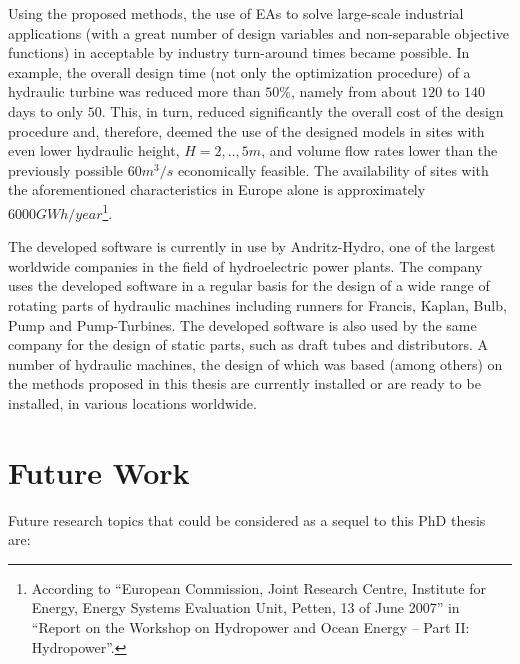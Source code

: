Using the proposed  methods, the use of EAs to solve large-scale industrial applications (with a great number of design variables and non-separable objective functions) in acceptable by industry turn-around times became possible. In example, the overall design time (not only the optimization procedure) of a hydraulic turbine was reduced more than $50\%$, namely from about $120$ to $140$ days to only $50$. This, in turn, reduced significantly the overall cost of the design procedure and, therefore, deemed the use of the designed models in sites with even lower hydraulic height, $H=2,..,5m$, and volume flow rates lower than the previously possible $60m^3/s$ economically feasible. The availability of sites with the aforementioned characteristics in Europe alone is approximately $6000GWh/year$\footnote{According to ``European Commission, Joint Research Centre, Institute for Energy, Energy Systems Evaluation Unit,  Petten, 13 of June 2007'' in  ``Report on the Workshop on Hydropower and Ocean Energy – Part II: Hydropower''.}.

The developed software is currently in use by Andritz-Hydro, one of the largest worldwide companies in the field of hydroelectric power plants. The company uses the developed software in a regular basis for the design of a wide range of rotating parts of hydraulic machines including runners for Francis, Kaplan, Bulb, Pump and Pump-Turbines. The developed software is also used by the same company for the design of static parts, such as draft tubes and distributors. A number of hydraulic machines, the design of which was based (among others) on the methods proposed in this thesis are currently installed or are ready to be installed,  in various locations worldwide.         


\section{Future Work}

Future research topics that could be considered as a sequel to this PhD thesis are:

